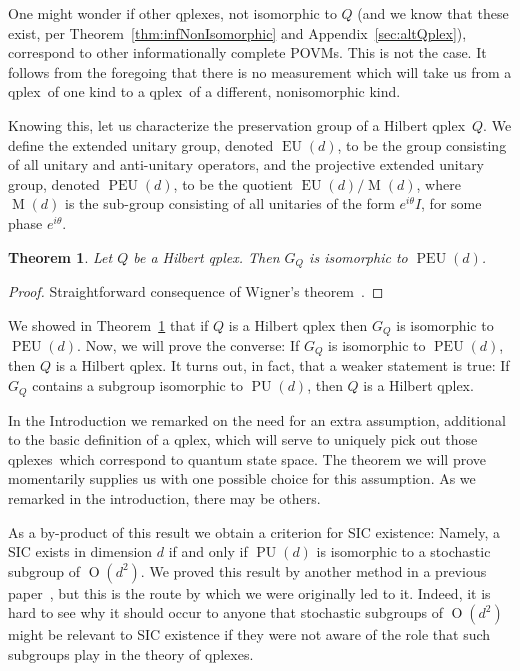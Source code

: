 \documentclass[aps,pra,superscriptaddress,10pt,tightenlines,twocolumn,nofootinbib]{revtex4}
\newtheorem{theorem}{Theorem}
\theoremstyle{remark}
\newcommand{\qp}{Q}
\newcommand{\qplex}{qplex}
\newcommand{\qplexes}{qplexes}
\newcommand{\qgp}[1]{G_{#1}}
\DeclareMathOperator{\Ot}{O}
\DeclareMathOperator{\PU}{PU}
\DeclareMathOperator{\EU}{EU}
\DeclareMathOperator{\PEU}{PEU}
\DeclareMathOperator{\M}{M}
\begin{document}
One might wonder if other \qplexes, not isomorphic to $\qp$ (and we know that these exist, per Theorem~\ref{thm:infNonIsomorphic} and Appendix~\ref{sec:altQplex}), correspond to other informationally complete POVMs.  This is not the case.  It follows from the foregoing that there is no measurement which will take us from a \qplex\ of one kind to a \qplex\ of a different, nonisomorphic kind.

Knowing this, let us characterize the preservation group of a Hilbert \qplex\ $\qp$.  We define the extended unitary group, denoted $\EU(d)$,  to be the group consisting of all unitary and anti-unitary operators, and the projective extended unitary group, denoted $\PEU(d)$, to be the quotient $\EU(d)/\M(d)$, where  $\M(d)$ is the sub-group consisting of all unitaries of the form $e^{i\theta} I$, for some phase $e^{i\theta}$.
\begin{theorem}
\label{eq:qisoSGpPeU}
Let $\qp$ be a Hilbert qplex.  Then $\qgp{\qp}$ is isomorphic to $\PEU(d)$.
\end{theorem}
\begin{proof}
Straightforward consequence of Wigner's theorem~\cite{Wigner}.
\end{proof}

 We showed in  Theorem~\ref{eq:qisoSGpPeU} that if $\qp$ is a Hilbert qplex then $\qgp{\qp}$ is isomorphic to $\PEU(d)$.  Now, we will prove the converse:  If $\qgp{\qp}$ is isomorphic to $\PEU(d)$, then $\qp$ is a Hilbert qplex.  It turns out, in fact, that a weaker statement is true:  If $\qgp{\qp}$ contains a subgroup isomorphic to $\PU(d)$, then $\qp$ is a Hilbert qplex.

 In the Introduction we remarked on the need for an extra assumption,
 additional to the basic definition of a qplex, which will serve to
 uniquely pick out those \qplexes\ which correspond to quantum state
 space.  The theorem we will prove momentarily supplies us with one
 possible choice for this assumption.  As we remarked in the
 introduction, there may be others.


 As a by-product of this result we obtain a criterion for SIC existence:  Namely, a SIC exists in dimension $d$ if and only if $\PU(d)$ is isomorphic to a stochastic subgroup of $\Ot(d^2)$.  We proved this result by another method in a previous paper~\cite{GroupAlg}, but this is the route by which we were originally led to it. Indeed, it is hard to see why it should occur to anyone that stochastic subgroups of $\Ot(d^2)$ might be relevant to SIC existence if they were not aware of the role that such subgroups play in the theory of \qplexes.
\end{document}
